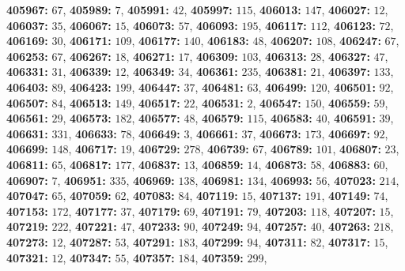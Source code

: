 \textsf{\bfseries 405967:} $67$, \textsf{\bfseries 405989:} $7$, \textsf{\bfseries 405991:} $42$, \textsf{\bfseries 405997:} $115$, \textsf{\bfseries 406013:} $147$, \textsf{\bfseries 406027:} $12$, \textsf{\bfseries 406037:} $35$, \textsf{\bfseries 406067:} $15$, \textsf{\bfseries 406073:} $57$, \textsf{\bfseries 406093:} $195$, \textsf{\bfseries 406117:} $112$, \textsf{\bfseries 406123:} $72$, \textsf{\bfseries 406169:} $30$, \textsf{\bfseries 406171:} $109$, \textsf{\bfseries 406177:} $140$, \textsf{\bfseries 406183:} $48$, \textsf{\bfseries 406207:} $108$, \textsf{\bfseries 406247:} $67$, \textsf{\bfseries 406253:} $67$, \textsf{\bfseries 406267:} $18$, \textsf{\bfseries 406271:} $17$, \textsf{\bfseries 406309:} $103$, \textsf{\bfseries 406313:} $28$, \textsf{\bfseries 406327:} $47$, \textsf{\bfseries 406331:} $31$, \textsf{\bfseries 406339:} $12$, \textsf{\bfseries 406349:} $34$, \textsf{\bfseries 406361:} $235$, \textsf{\bfseries 406381:} $21$, \textsf{\bfseries 406397:} $133$, \textsf{\bfseries 406403:} $89$, \textsf{\bfseries 406423:} $199$, \textsf{\bfseries 406447:} $37$, \textsf{\bfseries 406481:} $63$, \textsf{\bfseries 406499:} $120$, \textsf{\bfseries 406501:} $92$, \textsf{\bfseries 406507:} $84$, \textsf{\bfseries 406513:} $149$, \textsf{\bfseries 406517:} $22$, \textsf{\bfseries 406531:} $2$, \textsf{\bfseries 406547:} $150$, \textsf{\bfseries 406559:} $59$, \textsf{\bfseries 406561:} $29$, \textsf{\bfseries 406573:} $182$, \textsf{\bfseries 406577:} $48$, \textsf{\bfseries 406579:} $115$, \textsf{\bfseries 406583:} $40$, \textsf{\bfseries 406591:} $39$, \textsf{\bfseries 406631:} $331$, \textsf{\bfseries 406633:} $78$, \textsf{\bfseries 406649:} $3$, \textsf{\bfseries 406661:} $37$, \textsf{\bfseries 406673:} $173$, \textsf{\bfseries 406697:} $92$, \textsf{\bfseries 406699:} $148$, \textsf{\bfseries 406717:} $19$, \textsf{\bfseries 406729:} $278$, \textsf{\bfseries 406739:} $67$, \textsf{\bfseries 406789:} $101$, \textsf{\bfseries 406807:} $23$, \textsf{\bfseries 406811:} $65$, \textsf{\bfseries 406817:} $177$, \textsf{\bfseries 406837:} $13$, \textsf{\bfseries 406859:} $14$, \textsf{\bfseries 406873:} $58$, \textsf{\bfseries 406883:} $60$, \textsf{\bfseries 406907:} $7$, \textsf{\bfseries 406951:} $335$, \textsf{\bfseries 406969:} $138$, \textsf{\bfseries 406981:} $134$, \textsf{\bfseries 406993:} $56$, \textsf{\bfseries 407023:} $214$, \textsf{\bfseries 407047:} $65$, \textsf{\bfseries 407059:} $62$, \textsf{\bfseries 407083:} $84$, \textsf{\bfseries 407119:} $15$, \textsf{\bfseries 407137:} $191$, \textsf{\bfseries 407149:} $74$, \textsf{\bfseries 407153:} $172$, \textsf{\bfseries 407177:} $37$, \textsf{\bfseries 407179:} $69$, \textsf{\bfseries 407191:} $79$, \textsf{\bfseries 407203:} $118$, \textsf{\bfseries 407207:} $15$, \textsf{\bfseries 407219:} $222$, \textsf{\bfseries 407221:} $47$, \textsf{\bfseries 407233:} $90$, \textsf{\bfseries 407249:} $94$, \textsf{\bfseries 407257:} $40$, \textsf{\bfseries 407263:} $218$, \textsf{\bfseries 407273:} $12$, \textsf{\bfseries 407287:} $53$, \textsf{\bfseries 407291:} $183$, \textsf{\bfseries 407299:} $94$, \textsf{\bfseries 407311:} $82$, \textsf{\bfseries 407317:} $15$, \textsf{\bfseries 407321:} $12$, \textsf{\bfseries 407347:} $55$, \textsf{\bfseries 407357:} $184$, \textsf{\bfseries 407359:} $299$, 
